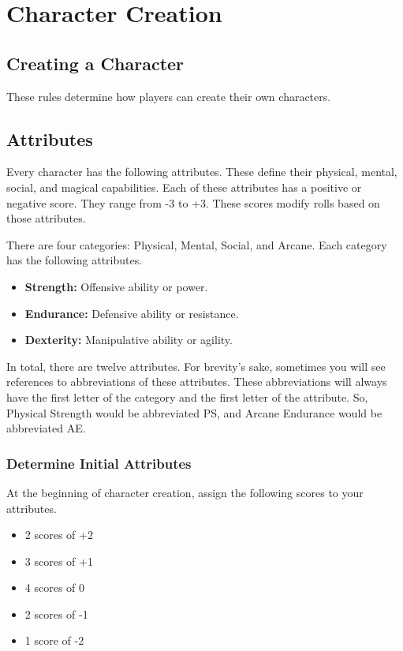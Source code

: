 \chapter{Character Creation}

\begin{multicols}{2}

\section{Creating a Character}

These rules determine how players can create their own characters.

\section{Attributes}

Every character has the following attributes. These define their 
physical, mental, social, and magical capabilities. Each of these 
attributes has a positive or negative score. They range from -3 to +3. 
These scores modify rolls based on those attributes.

There are four categories: Physical, Mental, Social, and Arcane. 
Each category has the following attributes.

\begin{itemize}
    \item \textbf{Strength:} Offensive ability or power.
    \item \textbf{Endurance:} Defensive ability or resistance.
    \item \textbf{Dexterity:} Manipulative ability or agility.
\end{itemize}

In total, there are twelve attributes. For brevity's sake, sometimes 
you will see references to abbreviations of these attributes. These 
abbreviations will always have the first letter of the category and 
the first letter of the attribute. So, Physical Strength would be 
abbreviated PS, and Arcane Endurance would be abbreviated AE.

\subsection{Determine Initial Attributes}

At the beginning of character creation, assign the following scores to 
your attributes.

\begin{itemize}
    \item 2 scores of +2
    \item 3 scores of +1
    \item 4 scores of 0
    \item 2 scores of -1
    \item 1 score of -2
\end{itemize}


\end{multicols}
